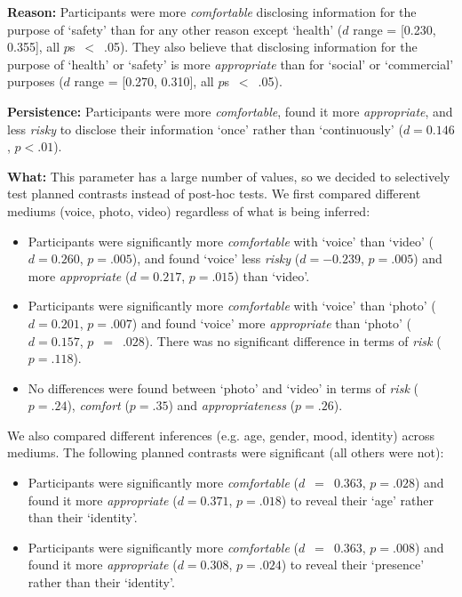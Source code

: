 \textbf{Reason:} Participants were more \emph{comfortable} disclosing information for the purpose of `safety' than for any other reason except `health' ($d$ range = [0.230, 0.355], all $p$s~$<$~.05). They also believe that disclosing information for the purpose of `health' or `safety' is more \emph{appropriate} than for `social' or `commercial' purposes ($d$ range = [0.270, 0.310], all $p$s~$<$~.05).

\textbf{Persistence:} Participants were more \emph{comfortable}, found it more \emph{appropriate}, and less \emph{risky} to disclose their information `once' rather than `continuously' ($d = 0.146$, $p < .01$).

\textbf{What:} This parameter has a large number of values, so we decided to selectively test planned contrasts instead of post-hoc tests. We first compared different mediums (voice, photo, video) regardless of what is being inferred:
\begin{itemize}
	\item Participants were significantly more \emph{comfortable} with `voice' than `video' ($d = 0.260$, $p = .005$), and found `voice' less \emph{risky} ($d = -0.239$, $p = .005$) and more \emph{appropriate} ($d = 0.217$, $p = .015$) than `video'.
	\item Participants were significantly more \emph{comfortable} with `voice' than `photo' ($d=0.201$, $p = .007$) and found `voice' more \emph{appropriate} than `photo' ($d = 0.157$, $p$~$=$~$.028$). There was no significant difference in terms of \emph{risk} ($p = .118$).
	\item No differences were found between `photo' and `video' in terms of \emph{risk} ($p = .24$), \emph{comfort} ($p = .35$) and \emph{appropriateness} ($p = .26$).
\end{itemize}

We also compared different inferences (e.g. age, gender, mood, identity) across mediums. The following planned contrasts were significant (all others were not):
\begin{itemize}
	\item Participants were significantly more \emph{comfortable} ($d$~$=$~$0.363$, $p = .028$) and found it more \emph{appropriate} ($d = 0.371$, $p = .018$) to reveal their `age' rather than their `identity'.
	\item Participants were significantly more \emph{comfortable} ($d$~$=$~$0.363$, $p= .008$) and found it more \emph{appropriate} ($d = 0.308$, $p = .024$) to reveal their `presence' rather than their `identity'. 
\end{itemize}

